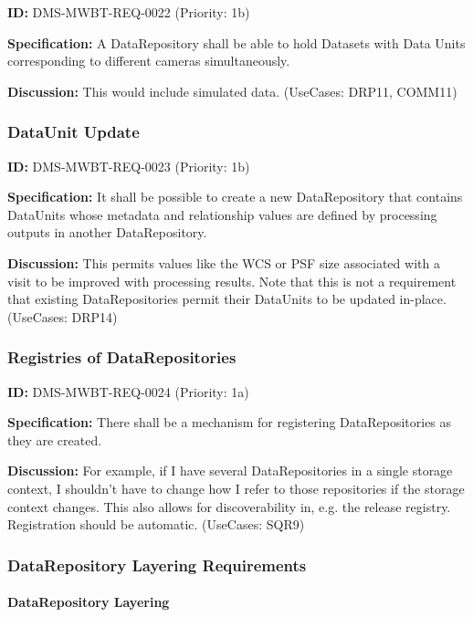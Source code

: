 \documentclass[SE,toc,lsstdraft]{lsstdoc}
\begin{document}
\label{DMS-MWBT-REQ-0022}
\textbf{ID:} DMS-MWBT-REQ-0022 (Priority: 1b)

\textbf{Specification:}
A DataRepository shall be able to hold Datasets with Data Units corresponding to different cameras simultaneously.

\textbf{Discussion:}
This would include simulated data. (UseCases: DRP11, COMM11)

\subsubsection{DataUnit Update}

\label{DMS-MWBT-REQ-0023}
\textbf{ID:} DMS-MWBT-REQ-0023 (Priority: 1b)

\textbf{Specification:}
It shall be possible to create a new DataRepository that contains DataUnits whose metadata and relationship values are defined by processing outputs in another DataRepository.

\textbf{Discussion:}
This permits values like the WCS or PSF size associated with a visit to be improved with processing results. Note that this is not a requirement that existing DataRepositories permit their DataUnits to be updated in-place. (UseCases: DRP14)

\subsubsection{Registries of DataRepositories}

\label{DMS-MWBT-REQ-0024}
\textbf{ID:} DMS-MWBT-REQ-0024 (Priority: 1a)

\textbf{Specification:}
There shall be a mechanism for registering DataRepositories as they are created.

\textbf{Discussion:}
For example, if I have several DataRepositories in a single storage context, I shouldn't have to change how I refer to those repositories if the storage context changes. This also allows for discoverability in, e.g. the release registry. Registration should be automatic. (UseCases: SQR9)

\subsubsection{DataRepository Layering Requirements}

\paragraph{DataRepository Layering}\hfill  %
\end{document}
